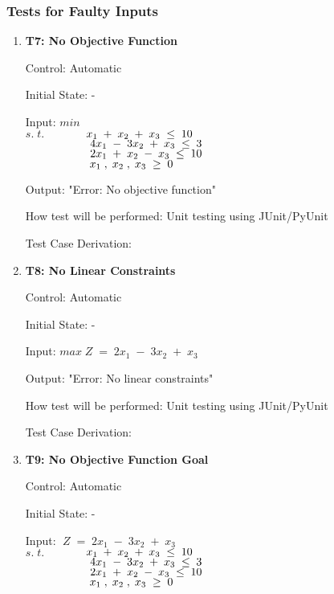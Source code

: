 \documentclass[12pt, titlepage]{article}
\begin{document}
\subsubsection{Tests for Faulty Inputs}

\begin{enumerate}
	\item{\textbf{T7: No Objective Function}}
	
	Control: Automatic
	
	Initial State: -
	
	Input: $min $\\
	$s.\;t.$$\hspace*{1.3cm} x_1\;+\;x_2\;+\;x_3\; \leq \;10$\\
	$\hspace*{2cm} 4x_1\;-\;3x_2\;+\;x_3\; \leq \;3$\\
	$\hspace*{2cm} 2x_1\;+\;x_2\;-\;x_3\; \leq \;10$\\
	$\hspace*{2cm} x_1\;,\;x_2\;,\;x_3\; \geq \;0$
	
	Output: "Error: No objective function"
	
	How test will be performed: Unit testing using JUnit/PyUnit
	
	Test Case Derivation: 
	
	\item{\textbf{T8: No Linear Constraints}}
	
	Control: Automatic
	
	Initial State: -
	
	Input: $max\;Z\;=\;2x_1\;-\;3x_2\;+\;x_3$
	
	Output: "Error: No linear constraints"
	
	How test will be performed: Unit testing using JUnit/PyUnit
	
	Test Case Derivation: 
	
	\item{\textbf{T9: No Objective Function Goal}}
	
	Control: Automatic
	
	Initial State: -
	
	Input: $\;Z\;=\;2x_1\;-\;3x_2\;+\;x_3$\\
	$s.\;t.$$\hspace*{1.3cm} x_1\;+\;x_2\;+\;x_3\; \leq \;10$\\
	$\hspace*{2cm} 4x_1\;-\;3x_2\;+\;x_3\; \leq \;3$\\
	$\hspace*{2cm} 2x_1\;+\;x_2\;-\;x_3\; \leq \;10$\\
	$\hspace*{2cm} x_1\;,\;x_2\;,\;x_3\; \geq \;0$
	

\end{enumerate}
\end{document}

